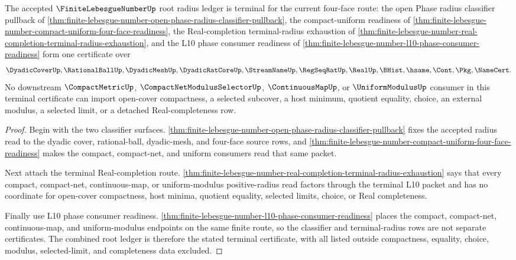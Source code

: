 \begin{theorem}
\label{thm:finite-lebesgue-number-root-unblock-terminal-package}
The accepted $\FiniteLebesgueNumberUp$ root radius ledger is terminal for the current four-face route: the open Phase radius classifier pullback of \autoref{thm:finite-lebesgue-number-open-phase-radius-classifier-pullback}, the compact-uniform readiness of \autoref{thm:finite-lebesgue-number-compact-uniform-four-face-readiness}, the Real-completion terminal-radius exhaustion of \autoref{thm:finite-lebesgue-number-real-completion-terminal-radius-exhaustion}, and the L10 phase consumer readiness of \autoref{thm:finite-lebesgue-number-l10-phase-consumer-readiness} form one certificate over
$$
\DyadicCoverUp,\RationalBallUp,\DyadicMeshUp,\DyadicRatCoreUp,\StreamNameUp,\RegSeqRatUp,\RealUp,\BHist,\hsame,\Cont,\Pkg,\NameCert .
$$
No downstream $\CompactMetricUp$, $\CompactNetModulusSelectorUp$, $\ContinuousMapUp$, or $\UniformModulusUp$ consumer in this terminal certificate can import open-cover compactness, a selected subcover, a host minimum, quotient equality, choice, an external modulus, a selected limit, or a detached Real-completeness row.
\end{theorem}
\begin{proof}
Begin with the two classifier surfaces. \autoref{thm:finite-lebesgue-number-open-phase-radius-classifier-pullback} fixes the accepted radius read to the dyadic cover, rational-ball, dyadic-mesh, and four-face source rows, and \autoref{thm:finite-lebesgue-number-compact-uniform-four-face-readiness} makes the compact, compact-net, and uniform consumers read that same packet.

Next attach the terminal Real-completion route. \autoref{thm:finite-lebesgue-number-real-completion-terminal-radius-exhaustion} says that every compact, compact-net, continuous-map, or uniform-modulus positive-radius read factors through the terminal L10 packet and has no coordinate for open-cover compactness, host minima, quotient equality, selected limits, choice, or Real completeness.

Finally use L10 phase consumer readiness. \autoref{thm:finite-lebesgue-number-l10-phase-consumer-readiness} places the compact, compact-net, continuous-map, and uniform-modulus endpoints on the same finite route, so the classifier and terminal-radius rows are not separate certificates. The combined root ledger is therefore the stated terminal certificate, with all listed outside compactness, equality, choice, modulus, selected-limit, and completeness data excluded.
\end{proof}
